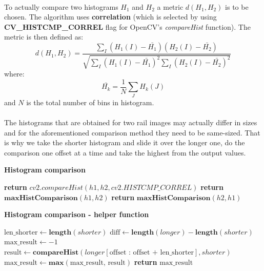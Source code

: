 \paragraph{}
To actually compare two histograms $H_1$ and $H_2$ a metric $d(H_1, H_2)$ is to be chosen. The algorithm uses \textbf{correlation} (which is selected by using \textbf{CV\_HISTCMP\_CORREL} flag for OpenCV's \textit{compareHist} function). The metric is then defined as:
\begin{equation}
	d(H_1, H_2) = \frac{\sum_I(H_1(I) - \bar{H_1})(H_2(I) - \bar{H_2})}{\sqrt{\sum_I(H_1(I) - \bar{H_1})^2 \sum_I(H_2(I) - \bar{H_2})^2}}
\end{equation}
where:
\begin{equation}
	\bar{H_k} = \frac{1}{N} \sum_J H_k(J)
\end{equation}
and $N$ is the total number of bins in histogram.

\paragraph{}
The histograms that are obtained for two rail images may actually differ in sizes and for the aforementioned comparison method they need to be same-sized. That is why we take the shorter histogram and slide it over the longer one, do the comparison one offset at a time and take the highest from the output values.

\begin{algorithm}{\textbf{Histogram comparison}}
	\begin{spacing}{1.5}
	\begin{algorithmic}[1]
				\State \textbf{return} $cv2.compareHist(h1, h2, cv2.HISTCMP\_CORREL)$
				\State \textbf{return} $\textbf{maxHistComparison}(h1, h2)$
			\Else
				\State \textbf{return} $\textbf{maxHistComparison}(h2, h1)$
			\EndIf
		\EndFunction
	\end{algorithmic}
	\end{spacing}
\end{algorithm}

\begin{algorithm}{\textbf{Histogram comparison - helper function}}
	\begin{spacing}{1.5}
	\begin{algorithmic}[1]
			\State $\text{len\_shorter} \gets \textbf{length}(shorter)$
			\State $\text{diff} \gets \textbf{length}(longer) - \textbf{length}(shorter)$
			\State $\text{max\_result} \gets -1$
				\State $\text{result} \gets \textbf{compareHist}(longer[\text{offset : offset + len\_shorter}], shorter)$
				\State $\text{max\_result} \gets \textbf{max}(\text{max\_result, result})$
			\EndFor
			\State \textbf{return} $\text{max\_result}$
		\EndFunction
	\end{algorithmic}
	\end{spacing}
\end{algorithm}

